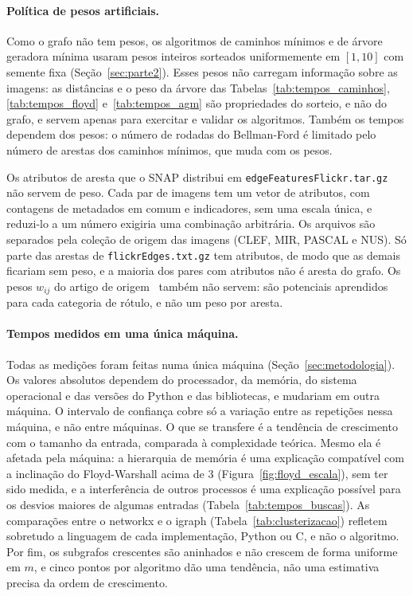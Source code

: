 \paragraph{Política de pesos artificiais.} Como o grafo não tem pesos, os algoritmos de caminhos mínimos e de árvore geradora mínima usaram pesos inteiros sorteados uniformemente em $[1, 10]$ com semente fixa (Seção~\ref{sec:parte2}). Esses pesos não carregam informação sobre as imagens: as distâncias e o peso da árvore das Tabelas~\ref{tab:tempos_caminhos}, \ref{tab:tempos_floyd} e~\ref{tab:tempos_agm} são propriedades do sorteio, e não do grafo, e servem apenas para exercitar e validar os algoritmos. Também os tempos dependem dos pesos: o número de rodadas do Bellman-Ford é limitado pelo número de arestas dos caminhos mínimos, que muda com os pesos.

Os atributos de aresta que o SNAP distribui em \texttt{edgeFeaturesFlickr.tar.gz} não servem de peso. Cada par de imagens tem um vetor de atributos, com contagens de metadados em comum e indicadores, sem uma escala única, e reduzi-lo a um número exigiria uma combinação arbitrária. Os arquivos são separados pela coleção de origem das imagens (CLEF, MIR, PASCAL e NUS). Só parte das arestas de \texttt{flickrEdges.txt.gz} tem atributos, de modo que as demais ficariam sem peso, e a maioria dos pares com atributos não é aresta do grafo. Os pesos $w_{ij}$ do artigo de origem~\cite{mcauley2012image} também não servem: são potenciais aprendidos para cada categoria de rótulo, e não um peso por aresta.

\paragraph{Tempos medidos em uma única máquina.} Todas as medições foram feitas numa única máquina (Seção~\ref{sec:metodologia}). Os valores absolutos dependem do processador, da memória, do sistema operacional e das versões do Python e das bibliotecas, e mudariam em outra máquina. O intervalo de confiança cobre só a variação entre as repetições nessa máquina, e não entre máquinas. O que se transfere é a tendência de crescimento com o tamanho da entrada, comparada à complexidade teórica. Mesmo ela é afetada pela máquina: a hierarquia de memória é uma explicação compatível com a inclinação do Floyd-Warshall acima de 3 (Figura~\ref{fig:floyd_escala}), sem ter sido medida, e a interferência de outros processos é uma explicação possível para os desvios maiores de algumas entradas (Tabela~\ref{tab:tempos_buscas}). As comparações entre o networkx e o igraph (Tabela~\ref{tab:clusterizacao}) refletem sobretudo a linguagem de cada implementação, Python ou C, e não o algoritmo. Por fim, os subgrafos crescentes são aninhados e não crescem de forma uniforme em $m$, e cinco pontos por algoritmo dão uma tendência, não uma estimativa precisa da ordem de crescimento.

